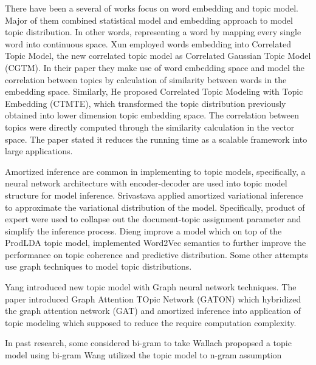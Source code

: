 There have been a several of works focus on word embedding and topic model. Major of them combined statistical model and embedding approach to model topic distribution. In other words, representing a word by mapping every single word into continuous space.
Xun \cite{he_efficient_2017} employed words embedding into Correlated Topic Model, the new correlated topic model as Correlated Gaussian Topic Model (CGTM). In their paper they make use of word embedding space and model the correlation between topics by calculation of similarity between words in the embedding space.
Similarly, He\cite{xun_correlated_nodate} proposed Correlated Topic Modeling with Topic Embedding (CTMTE), which transformed the topic distribution previously obtained into lower dimension topic embedding space. The correlation between topics were directly computed through the similarity calculation in the vector space. The paper stated it reduces the running time as a scalable framework into large applications.

Amortized inference are common in implementing to topic models, specifically, a neural network architecture with encoder-decoder are used into topic model structure for model inference.
Srivastava \cite{srivastava_autoencoding_2017} applied amortized variational inference to approximate the variational distribution of the model. Specifically, product of expert were used to collapse out the document-topic assignment parameter and simplify the inference process.
Dieng \cite{dieng_topic_2019} improve a model which on top of the ProdLDA topic model, implemented Word2Vec semantics to further improve the performance on topic coherence and predictive distribution.
Some other attempts use graph techniques to model topic distributions.

Yang\cite{yang_graph_2020} introduced new topic model with Graph neural network techniques. The paper introduced Graph Attention TOpic Network (GATON) which hybridized the graph attention network (GAT) and amortized inference into application of topic modeling which supposed to reduce the require computation complexity.

In past research, some considered bi-gram to take 
Wallach propopsed a topic model using bi-gram \cite{wallach_topic_2006}
Wang \cite{wang_topical_2007} utilized the topic model to n-gram assumption